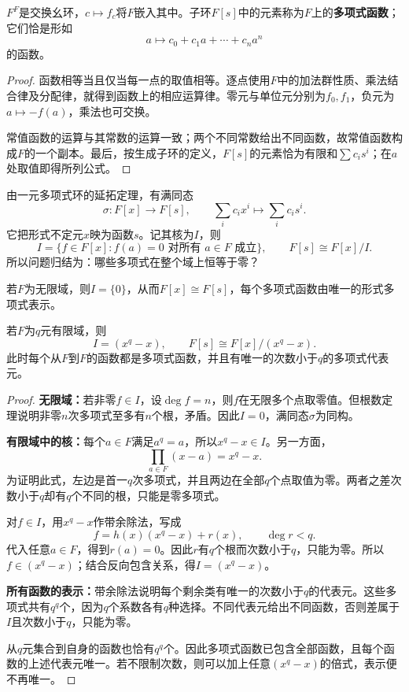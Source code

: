 \begin{proposition}
$F^F$是交换幺环，$c\mapsto f_c$将$F$嵌入其中。子环$F[s]$中的元素称为$F$上的\textbf{多项式函数}；它们恰是形如
\[
a\longmapsto c_0+c_1a+\cdots+c_na^n
\]
的函数。
\end{proposition}
\begin{proof}
函数相等当且仅当每一点的取值相等。逐点使用$F$中的加法群性质、乘法结合律及分配律，就得到函数上的相应运算律。零元与单位元分别为$f_0,f_1$，负元为$a\mapsto-f(a)$，乘法也可交换。

常值函数的运算与其常数的运算一致；两个不同常数给出不同函数，故常值函数构成$F$的一个副本。最后，按生成子环的定义，$F[s]$的元素恰为有限和$\sum c_i s^i$；在$a$处取值即得所列公式。
\end{proof}

由一元多项式环的延拓定理，有满同态
\[
\sigma:F[x]\longrightarrow F[s],\qquad
\sum_i c_i x^i\longmapsto\sum_i c_i s^i.
\]
它把形式不定元$x$映为函数$s$。记其核为$I$，则
\[
I=\{f\in F[x]:f(a)=0\text{ 对所有 }a\in F\text{ 成立}\},
\qquad F[s]\cong F[x]/I.
\]
所以问题归结为：哪些多项式在整个域上恒等于零？

\begin{theorem}\label{p2:poly-functions-one}
若$F$为无限域，则$I=\{0\}$，从而$F[x]\cong F[s]$，每个多项式函数由唯一的形式多项式表示。

若$F$为$q$元有限域，则
\[
I=(x^q-x),\qquad F[s]\cong F[x]/(x^q-x).
\]
此时每个从$F$到$F$的函数都是多项式函数，并且有唯一的次数小于$q$的多项式代表元。
\end{theorem}
\begin{proof}
\textbf{无限域：}若非零$f\in I$，设$\deg f=n$，则$f$在无限多个点取零值。但根数定理说明非零$n$次多项式至多有$n$个根，矛盾。因此$I=0$，满同态$\sigma$为同构。

\textbf{有限域中的核：}每个$a\in F$满足$a^q=a$，所以$x^q-x\in I$。另一方面，
\[
\prod_{a\in F}(x-a)=x^q-x.
\]
为证明此式，左边是首一$q$次多项式，并且两边在全部$q$个点取值为零。两者之差次数小于$q$却有$q$个不同的根，只能是零多项式。

对$f\in I$，用$x^q-x$作带余除法，写成
\[
f=h(x)(x^q-x)+r(x),\qquad\deg r<q.
\]
代入任意$a\in F$，得到$r(a)=0$。因此$r$有$q$个根而次数小于$q$，只能为零。所以$f\in(x^q-x)$；结合反向包含关系，得$I=(x^q-x)$。

\textbf{所有函数的表示：}带余除法说明每个剩余类有唯一的次数小于$q$的代表元。这些多项式共有$q^q$个，因为$q$个系数各有$q$种选择。不同代表元给出不同函数，否则差属于$I$且次数小于$q$，只能为零。

从$q$元集合到自身的函数也恰有$q^q$个。因此多项式函数已包含全部函数，且每个函数的上述代表元唯一。若不限制次数，则可以加上任意$(x^q-x)$的倍式，表示便不再唯一。
\end{proof}


